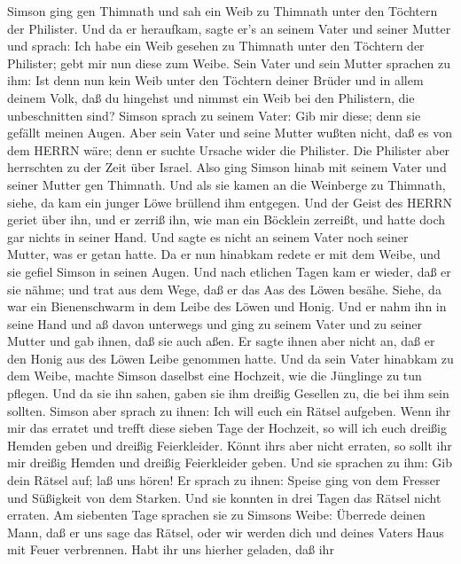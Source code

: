  Simson ging gen Thimnath und sah ein Weib zu Thimnath unter
den Töchtern der Philister.  Und da er heraufkam, sagte er's
an seinem Vater und seiner Mutter und sprach: Ich habe ein Weib gesehen
zu Thimnath unter den Töchtern der Philister; gebt mir nun diese zum
Weibe.  Sein Vater und sein Mutter sprachen zu ihm: Ist denn
nun kein Weib unter den Töchtern deiner Brüder und in allem deinem Volk,
daß du hingehst und nimmst ein Weib bei den Philistern, die
unbeschnitten sind? Simson sprach zu seinem Vater: Gib mir diese; denn
sie gefällt meinen Augen.  Aber sein Vater und seine Mutter
wußten nicht, daß es von dem HERRN wäre; denn er suchte Ursache wider
die Philister. Die Philister aber herrschten zu der Zeit über Israel.
 Also ging Simson hinab mit seinem Vater und seiner Mutter
gen Thimnath. Und als sie kamen an die Weinberge zu Thimnath, siehe, da
kam ein junger Löwe brüllend ihm entgegen.  Und der Geist
des HERRN geriet über ihn, und er zerriß ihn, wie man ein Böcklein
zerreißt, und hatte doch gar nichts in seiner Hand. Und sagte es nicht
an seinem Vater noch seiner Mutter, was er getan hatte.  Da
er nun hinabkam redete er mit dem Weibe, und sie gefiel Simson in seinen
Augen.  Und nach etlichen Tagen kam er wieder, daß er sie
nähme; und trat aus dem Wege, daß er das Aas des Löwen besähe. Siehe, da
war ein Bienenschwarm in dem Leibe des Löwen und Honig.  Und
er nahm ihn in seine Hand und aß davon unterwegs und ging zu seinem
Vater und zu seiner Mutter und gab ihnen, daß sie auch aßen. Er sagte
ihnen aber nicht an, daß er den Honig aus des Löwen Leibe genommen
hatte.  Und da sein Vater hinabkam zu dem Weibe, machte
Simson daselbst eine Hochzeit, wie die Jünglinge zu tun pflegen.
 Und da sie ihn sahen, gaben sie ihm dreißig Gesellen zu,
die bei ihm sein sollten.  Simson aber sprach zu ihnen: Ich
will euch ein Rätsel aufgeben. Wenn ihr mir das erratet und trefft diese
sieben Tage der Hochzeit, so will ich euch dreißig Hemden geben und
dreißig Feierkleider.  Könnt ihrs aber nicht erraten, so
sollt ihr mir dreißig Hemden und dreißig Feierkleider geben. Und sie
sprachen zu ihm: Gib dein Rätsel auf; laß uns hören!  Er
sprach zu ihnen: Speise ging von dem Fresser und Süßigkeit von dem
Starken. Und sie konnten in drei Tagen das Rätsel nicht erraten.
 Am siebenten Tage sprachen sie zu Simsons Weibe: Überrede
deinen Mann, daß er uns sage das Rätsel, oder wir werden dich und deines
Vaters Haus mit Feuer verbrennen. Habt ihr uns hierher geladen, daß ihr
